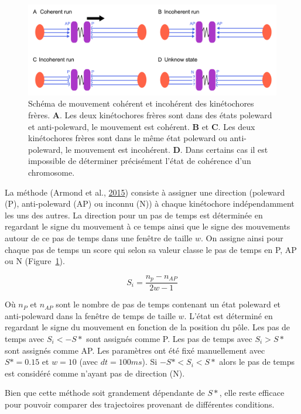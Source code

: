 \documentclass[12pt,a4paper,twoside,openright]{book}
\begin{document}
\begin{figure}[htbp]
\centering
\includegraphics{figures/results/imaging/coherence_schema.png}
\caption{\label{fig:coherence_schema}Schéma de mouvement cohérent et
incohérent des kinétochores frères. \textbf{A}. Les deux kinétochores
frères sont dans des états poleward et anti-poleward, le mouvement est
cohérent. \textbf{B} et \textbf{C}. Les deux kinétochores frères sont
dans le même état poleward ou anti-poleward, le mouvement est
incohérent. \textbf{D}. Dans certains cas il est impossible de
déterminer précisément l'état de cohérence d'un chromosome.}
\end{figure}

La méthode (Armond et al., \protect\hyperlink{ref-Armond2015}{2015})
consiste à assigner une direction (poleward (P), anti-poleward (AP) ou
inconnu (N)) à chaque kinétochore indépendamment les uns des autres. La
direction pour un pas de temps est déterminée en regardant le signe du
mouvement à ce temps ainsi que le signe des mouvements autour de ce pas
de temps dans une fenêtre de taille \(w\). On assigne ainsi pour chaque
pas de temps un score qui selon sa valeur classe le pas de temps en P,
AP ou N (Figure~\ref{fig:coherence_schema}).

\[
S_i = \frac{n_p - n_{AP}}{2w - 1}
\]

Où \(n_P\) et \(n_{AP}\) sont le nombre de pas de temps contenant un
état poleward et anti-poleward dans la fenêtre de temps de taille \(w\).
L'état est déterminé en regardant le signe du mouvement en fonction de
la position du pôle. Les pas de temps avec \(S_i < -S*\) sont assignés
comme P. Les pas de temps avec \(S_i > S*\) sont assignés comme AP. Les
paramètres ont été fixé manuellement avec \(S* = 0.15\) et \(w = 10\)
(avec \(dt=100ms\)). Si \(-S* < S_i < S*\) alors le pas de temps est
considéré comme n'ayant pas de direction (N).

Bien que cette méthode soit grandement dépendante de \(S*\), elle reste
efficace pour pouvoir comparer des trajectoires provenant de différentes
conditions.
\end{document}
